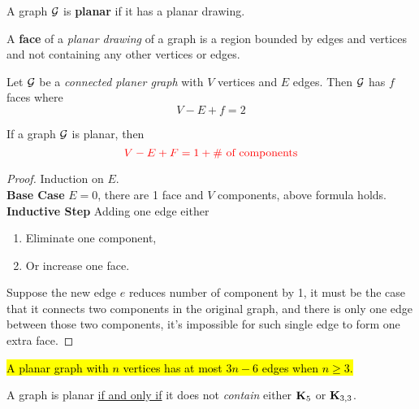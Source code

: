 \documentclass{article}
\begin{document}
			\begin{definition}
				A graph $\mathcal{{G}}$ is \textbf{planar} if it has a planar drawing.
			\end{definition}
			
			\begin{definition}
				A \textbf{face} of a \emph{planar drawing} of a graph is a region bounded by edges and vertices and not containing any other vertices or edges.
			\end{definition}

			\begin{theorem}
				Let $\mathcal{{G}}$ be a \emph{connected planer graph} with $V$ vertices and $E$ edges. Then $\mathcal{{G}}$ has $f$ faces where 
				\begin{equation}
					V - E + f = 2
				\end{equation}
			\end{theorem}
			
			\begin{theorem}
				If a graph $\mathcal{{G}}$ is planar, then
				\begin{equation}
					\textcolor{red}{V - E + F = 1 + \text{{\# of components}}}
				\end{equation}
				\begin{proof}
					Induction on $E$.\\
					\textbf{Base Case} $E=0$, there are 1 face and $V$ components, above formula holds. \\
					\textbf{Inductive Step} Adding one edge either
					\begin{enumerate}
						\item Eliminate one component,
						\item Or increase one face.
					\end{enumerate}
					Suppose the new edge $e$ reduces number of component by 1, it must be the case that it connects two components in the original graph, and there is only one edge between those two components, it's impossible for such single edge to form one extra face.
				\end{proof}
			\end{theorem}
			
			\begin{theorem}
				\hl{A planar graph with $n$ vertices has at most $3n - 6$ edges when $n \geq 3$.}
			\end{theorem}
			
			\begin{theorem}
				A graph is planar \ul{if and only if} it does not \emph{contain} either $\textbf{K}_5$ or $\textbf{K}_{3,3}$.
			\end{theorem}
			
\end{document}
